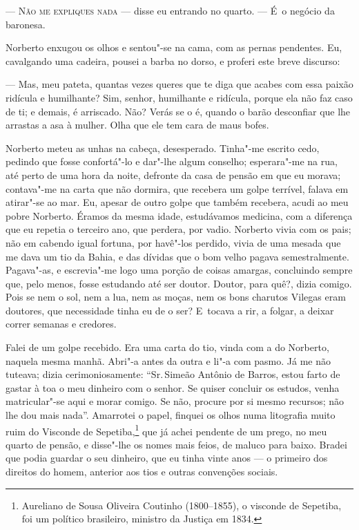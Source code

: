 \begin{linenumbers}

\textsc{--- Não me expliques nada} --- disse eu entrando no quarto. --- É~o negócio
da baronesa.

Norberto enxugou os olhos e sentou"-se na cama, com as pernas pendentes.
Eu, cavalgando uma cadeira, pousei a barba no dorso, e proferi este
breve discurso:

--- Mas, meu pateta, quantas vezes queres que te diga que acabes com essa
paixão ridícula e humilhante? Sim, senhor, humilhante e ridícula, porque
ela não faz caso de ti; e demais, é arriscado. Não? Verás se o é, quando
o barão desconfiar que lhe arrastas a asa à mulher. Olha que ele tem
cara de maus bofes.

Norberto meteu as unhas na cabeça, desesperado. Tinha"-me escrito cedo,
pedindo que fosse confortá"-lo e dar"-lhe algum conselho; esperara"-me na
rua, até perto de uma hora da noite, defronte da casa de pensão em que
eu morava; contava"-me na carta que não dormira, que recebera um golpe
terrível, falava em atirar"-se ao mar. Eu, apesar de outro golpe que
também recebera, acudi ao meu pobre Norberto. Éramos da mesma idade,
estudávamos medicina, com a diferença que eu repetia o terceiro ano, que
perdera, por vadio. Norberto vivia com os pais; não em cabendo igual
fortuna, por havê"-los perdido, vivia de uma mesada que me dava um tio da
Bahia, e das dívidas que o bom velho pagava semestralmente. Pagava"-as, e
escrevia"-me logo uma porção de coisas amargas, concluindo sempre que,
pelo menos, fosse estudando até ser doutor. Doutor, para quê?, dizia
comigo. Pois se nem o sol, nem a lua, nem as moças, nem os bons charutos
Vilegas eram doutores, que necessidade tinha eu de o ser? E~tocava a
rir, a folgar, a deixar correr semanas e credores.

Falei de um golpe recebido. Era uma carta do tio, vinda com a do
Norberto, naquela mesma manhã. Abri"-a antes da outra e li"-a com pasmo.
Já me não tuteava; dizia cerimoniosamente: ``Sr.\,Simeão Antônio de
Barros, estou farto de gastar à toa o meu dinheiro com o senhor. Se
quiser concluir os estudos, venha matricular"-se aqui e morar comigo. Se
não, procure por si mesmo recursos; não lhe dou mais nada''. Amarrotei o
papel, finquei os olhos numa litografia muito ruim do Visconde de
Sepetiba,\footnote{Aureliano de Sousa Oliveira Coutinho (1800--1855), o
  visconde de Sepetiba, foi um político brasileiro, ministro da Justiça
  em 1834.} que já achei pendente de um prego, no meu quarto de pensão,
e disse"-lhe os nomes mais feios, de maluco para baixo. Bradei que podia
guardar o seu dinheiro, que eu tinha vinte anos --- o primeiro dos
direitos do homem, anterior aos tios e outras convenções sociais.


\end{linenumbers}
